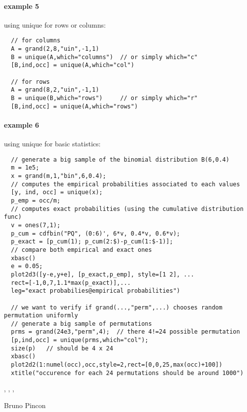 \begin{examples}
\paragraph{example 5} using unique for rows or columns:
\begin{Verbatim}
  // for columns
  A = grand(2,8,"uin",-1,1)
  B = unique(A,which="columns")  // or simply which="c"
  [B,ind,occ] = unique(A,which="col")

  // for rows
  A = grand(8,2,"uin",-1,1)
  B = unique(B,which="rows")     // or simply which="r"
  [B,ind,occ] = unique(A,which="rows")
\end{Verbatim}


\paragraph{example 6} using unique for basic statistics:
\begin{Verbatim}
  // generate a big sample of the binomial distribution B(6,0.4)
  m = 1e5;
  x = grand(m,1,"bin",6,0.4); 
  // computes the empirical probabilities associated to each values
  [y, ind, occ] = unique(x);
  p_emp = occ/m;
  // computes exact probabilities (using the cumulative distribution func)
  v = ones(7,1);
  p_cum = cdfbin("PQ", (0:6)', 6*v, 0.4*v, 0.6*v);
  p_exact = [p_cum(1); p_cum(2:$)-p_cum(1:$-1)];
  // compare both empirical and exact ones
  xbasc()
  e = 0.05;
  plot2d3([y-e,y+e], [p_exact,p_emp], style=[1 2], ...
  rect=[-1,0,7,1.1*max(p_exact)],...
  leg="exact probabilies@empirical probabilities")

  // we want to verify if grand(...,"perm",...) chooses random permutation uniformly
  // generate a big sample of permutations
  prms = grand(24e3,"perm",4);  // there 4!=24 possible permutation 
  [p,ind,occ] = unique(prms,which="col");
  size(p)   // should be 4 x 24
  xbasc()
  plot2d2(1:numel(occ),occ,style=2,rect=[0,0,25,max(occ)+100])
  xtitle("occurence for each 24 permutations should be around 1000")
\end{Verbatim}

\end{examples}

\begin{manseealso}
  , , ,   
\end{manseealso}

\begin{authors}
  Bruno Pincon
\end{authors}
